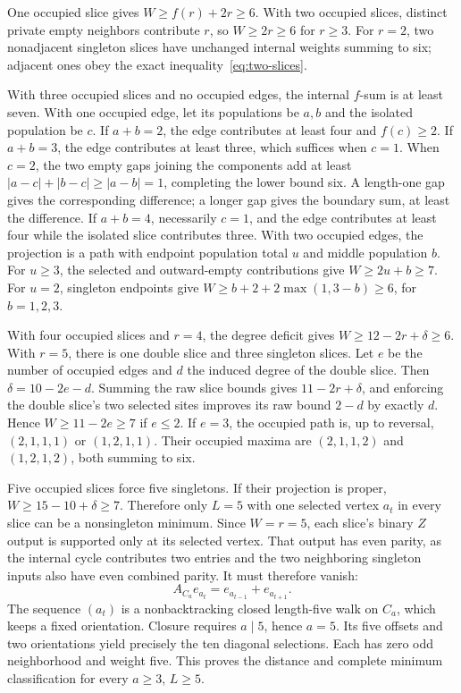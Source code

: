 One occupied slice gives $W\ge f(r)+2r\ge6$. With two occupied slices, distinct private empty neighbors contribute $r$, so $W\ge2r\ge6$ for $r\ge3$. For $r=2$, two nonadjacent singleton slices have unchanged internal weights summing to six; adjacent ones obey the exact inequality~\eqref{eq:two-slices}.

With three occupied slices and no occupied edges, the internal $f$-sum is at least seven. With one occupied edge, let its populations be $a,b$ and the isolated population be $c$. If $a+b=2$, the edge contributes at least four and $f(c)\ge2$. If $a+b=3$, the edge contributes at least three, which suffices when $c=1$. When $c=2$, the two empty gaps joining the components add at least $|a-c|+|b-c|\ge|a-b|=1$, completing the lower bound six. A length-one gap gives the corresponding difference; a longer gap gives the boundary sum, at least the difference. If $a+b=4$, necessarily $c=1$, and the edge contributes at least four while the isolated slice contributes three. With two occupied edges, the projection is a path with endpoint population total $u$ and middle population $b$. For $u\ge3$, the selected and outward-empty contributions give $W\ge2u+b\ge7$. For $u=2$, singleton endpoints give $W\ge b+2+2\max(1,3-b)\ge6$, for $b=1,2,3$.

With four occupied slices and $r=4$, the degree deficit gives $W\ge12-2r+\delta\ge6$. With $r=5$, there is one double slice and three singleton slices. Let $e$ be the number of occupied edges and $d$ the induced degree of the double slice. Then $\delta=10-2e-d$. Summing the raw slice bounds gives $11-2r+\delta$, and enforcing the double slice's two selected sites improves its raw bound $2-d$ by exactly $d$. Hence $W\ge11-2e\ge7$ if $e\le2$. If $e=3$, the occupied path is, up to reversal, $(2,1,1,1)$ or $(1,2,1,1)$. Their occupied maxima are $(2,1,1,2)$ and $(1,2,1,2)$, both summing to six.

Five occupied slices force five singletons. If their projection is proper, $W\ge15-10+\delta\ge7$. Therefore only $L=5$ with one selected vertex $a_t$ in every slice can be a nonsingleton minimum. Since $W=r=5$, each slice's binary $Z$ output is supported only at its selected vertex. That output has even parity, as the internal cycle contributes two entries and the two neighboring singleton inputs also have even combined parity. It must therefore vanish:
\[
 A_{C_a}e_{a_t}=e_{a_{t-1}}+e_{a_{t+1}}.
\]
The sequence $(a_t)$ is a nonbacktracking closed length-five walk on $C_a$, which keeps a fixed orientation. Closure requires $a\mid5$, hence $a=5$. Its five offsets and two orientations yield precisely the ten diagonal selections. Each has zero odd neighborhood and weight five. This proves the distance and complete minimum classification for every $a\ge3$, $L\ge5$.


